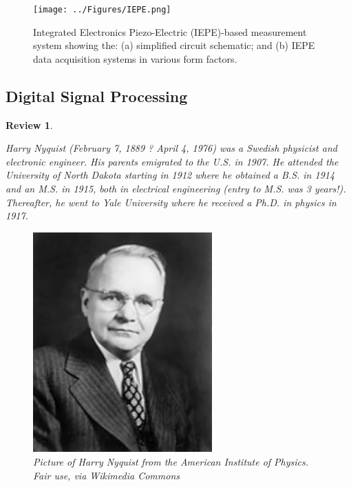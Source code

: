\documentclass[12pt,letter]{article}
\numberwithin{ex}{section} %
\newtheorem{re}{Review}
\numberwithin{re}{section} %
\newenvironment{review}{\begin{mdframed}[middlelinewidth=2mm,roundcorner=20pt]\begin{re}\normalfont}{\end{re}\end{mdframed}}
\newcommand{\bl}[1]{\textcolor[rgb]{0.00,0.00,1.00}{#1}}
\begin{document}


\begin{figure}[H]
    \centering
    \texttt{[image: ../Figures/IEPE.png]}
    \caption{Integrated Electronics Piezo-Electric (IEPE)-based measurement system showing the: (a) simplified circuit schematic\protect\footnotemark[1]; and (b) IEPE data acquisition systems in various form factors.}
    \label{fig:IEPE}
\end{figure} 







\subsection{Digital Signal Processing}


\begin{review}
	\label{sec:Laplace_review}
		
		Harry Nyquist (February 7, 1889 ? April 4, 1976) was a Swedish physicist and electronic engineer. His parents emigrated to the U.S. in 1907.  He attended the University of North Dakota starting in 1912 where he obtained a B.S. in 1914 and an M.S. in 1915, both in electrical engineering (entry to M.S. was 3 years!). Thereafter, he went to Yale University where he received a Ph.D. in physics in 1917.

		\begin{figure}[H]
			\centering
			\includegraphics[width=2.71in]{../figures/Harry_Nyquist.jpg}
			\caption{Picture of Harry Nyquist from the American Institute of Physics. \bl{Fair use, via Wikimedia Commons}}
			\label{fig:fragility_curve}
		\end{figure}


\end{review}
\end{document}
